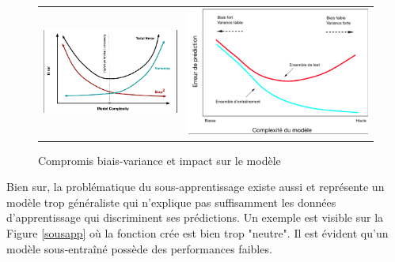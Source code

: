 \begin{figure}
    \begin{tabular}{cc}
        \includegraphics[scale=0.4]{./tex/regularisation/combv.png} & \includegraphics[scale=0.25]{./tex/regularisation/compbv2.png} \\
    \end{tabular}
        \caption{Compromis biais-variance et impact sur le modèle}
    \label{compbv}
\end{figure}

\noindent Bien sur, la problématique du sous-apprentissage existe aussi et représente un modèle trop généraliste qui n'explique pas suffisamment les données d'apprentissage qui discriminent ses prédictions. Un exemple est visible sur la Figure \ref{sousapp} où la fonction crée est bien trop "neutre". Il est évident qu'un modèle sous-entraîné possède des performances faibles.


